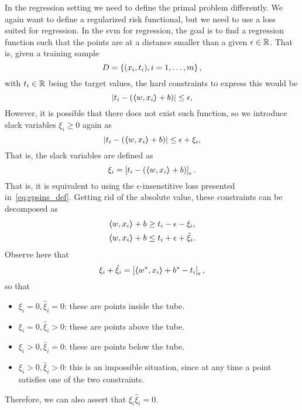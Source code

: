 In the regression setting we need to define the primal problem differently. We again want to define a regularized risk functional, but we need to use a loss suited for regression. In the \acrshort{svm} for regression, the goal is to find a regression function such that the points are at a distance smaller than a given $\epsilon \in \mathbb{R}$. 
%
That is, given a training sample 
$$ D = \left\{(x_i, t_i), i=1, \ldots, m\right\}, $$
with $t_i \in \mathbb{R}$ being the target values, the hard constraints to express this would be 
\begin{equation}
    \nonumber
    \left|t_i - (\bm{\left\langle} w, x_i \bm{\right\rangle} + b) \right| \leq \epsilon,
\end{equation}
However, it is possible that there does not exist such function, so we introduce slack variables $\xi_i \geq 0$ again as
\begin{equation}
    \nonumber
    \left|t_i - (\bm{\left\langle} w, x_i \bm{\right\rangle} + b) \right| \leq \epsilon + \xi_i,
\end{equation}
That is, the slack variables are defined as 
\begin{equation}
    \xi_i = \left[t_i - (\bm{\left\langle} w, x_i \bm{\right\rangle} + b)\right]_{\epsilon} .
\end{equation}
That is, it is equivalent to using the $\epsilon$-insenstitive loss presented in~\eqref{eq:epsins_def}.
Getting rid of the absolute value, these constraints can be decomposed as
\begin{equation}
    \nonumber
    \begin{aligned}
        \bm{\left\langle} w, x_i \bm{\right\rangle} + b &\geq t_i - \epsilon - \xi_i , \\
        \bm{\left\langle} w, x_i \bm{\right\rangle} + b &\leq t_i + \epsilon + \hat{\xi}_i.
    \end{aligned}
\end{equation}
Observe here that $$ \xi_i + \hat{\xi}_i = \left[\bm{\left\langle} {w}^*, x_i \bm{\right\rangle} + {b}^* - t_i\right]_{\epsilon} ,$$
so that
\begin{itemize}
    \item $\xi_i = 0, \hat{\xi}_i = 0$: these are points inside the tube.
    \item $\xi_i = 0, \hat{\xi}_i > 0$: these are points above the tube.
    \item $\xi_i > 0, \hat{\xi}_i = 0$: these are points below the tube.
    \item $\xi_i > 0, \hat{\xi}_i > 0$: this is an impossible situation, since at any time a point satisfies one of the two constraints.
\end{itemize}
Therefore, we can also assert that $\xi_i \hat{\xi}_i = 0$.
%
